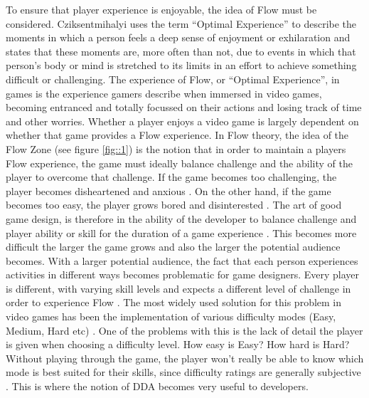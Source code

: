 \documentclass[journal]{IEEEtran}
\begin{document}
To ensure that player experience is enjoyable, the idea of Flow must be considered. Cziksentmihalyi \cite{czikszentmihalyi1990flow} \cite{csikszentmihalyi2014toward} uses the term ``Optimal Experience'' to describe the moments in which a person feels a deep sense of enjoyment or exhilaration and states that these moments are, more often than not, due to events in which that person's body or mind is stretched to its limits in an effort to achieve something difficult or challenging.
The experience of Flow, or ``Optimal Experience'', in games is the experience gamers describe when immersed in video games, becoming entranced and totally focussed on their actions and losing track of time and other worries. Whether a player enjoys a video game is largely dependent on whether that game provides a Flow experience. In Flow theory, the idea of the Flow Zone (see figure \ref{fig::1}) is the notion that in order to maintain a players Flow experience, the game must ideally balance challenge and the ability of the player to overcome that challenge. If the game becomes too challenging, the player becomes disheartened and anxious \cite{gilleade2004using}. On the other hand, if the game becomes too easy, the player grows bored and disinterested \cite{chanel2008boredom}. The art of good game design, is therefore in the ability of the developer to balance challenge and player ability or skill for the duration of a game experience \cite{koster2013theory}. This becomes more difficult the larger the game grows and also the larger the potential audience becomes. With a larger potential audience, the fact that each person experiences activities in different ways becomes problematic for game designers. Every player is different, with varying skill levels and expects a different level of challenge in order to experience Flow \cite{czikszentmihalyi1990flow}. The most widely used solution for this problem in video games has been the implementation of various difficulty modes (Easy, Medium, Hard etc) \cite{alexander2013investigation}. One of the problems with this is the lack of detail the player is given when choosing a difficulty level. How easy is Easy? How hard is Hard? Without playing through the game, the player won't really be able to know which mode is best suited for their skills, since difficulty ratings are generally subjective \cite{qin2009effects}. This is where the notion of DDA becomes very useful to developers.
\end{document}
